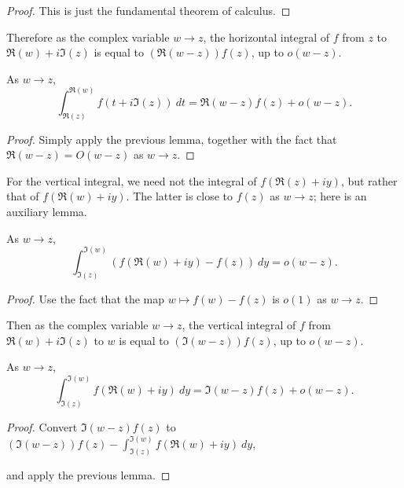  \begin{proof}

 This is just the fundamental theorem of calculus.

 \end{proof}


Therefore as the complex variable $w \to z$, the horizontal integral of $f$ from $z$ to
$\Re(w)+i\Im(z)$ is equal to $(\Re(w - z)) f(z)$, up to $o(w - z)$.
\begin{lemma}
  \label{deriv_of_wedgeInt_re}
  \leanok
  As $w \to z$,
  $$
    \int_{\Re(z)}^{\Re(w)} f(t + i\Im(z))\ dt
    =
    \Re(w-z) f(z)
    +
    o(w-z)
    .
  $$
\end{lemma}


 \begin{proof}

 Simply apply the previous lemma, together with the fact that $\Re(w - z) = O(w - z)$ as $w \to z$.

 \end{proof}


For the vertical integral, we need not the integral of $f(\Re(z)+iy)$, but rather that of $f(\Re(w)+iy)$.
The latter is close to $f(z)$ as $w \to z$; here is an auxiliary lemma.
\begin{lemma}
  \label{deriv_of_wedgeInt_im'}
  \leanok
  As $w \to z$,
  $$
    \int_{\Im(z)}^{\Im(w)} (f(\Re(w)+iy) - f (z))\ dy
    =
    o(w-z)
    .
  $$
\end{lemma}


 \begin{proof}

 Use the fact that the map $w \mapsto f(w)-f(z)$ is $o(1)$ as $w \to z$.

 \end{proof}


Then as the complex variable $w \to z$, the vertical integral of $f$ from $\Re(w)+i\Im(z)$ to
$w$ is equal to $(\Im(w - z)) f(z)$, up to $o(w - z)$.
\begin{lemma}
  \label{deriv_of_wedgeInt_im}
  \leanok
  As $w \to z$,
  $$
    \int_{\Im(z)}^{\Im(w)} f(\Re(w) + i y)\ dy
    =
    \Im(w-z) f(z)
    +
    o(w-z)
    .
  $$
\end{lemma}


 \begin{proof}

 Convert $\Im(w-z) f(z)$ to $(\Im(w-z)) f(z) - \int_{\Im(z)}^{\Im(w)} f(\Re(w) + i y)\ dy$,

 and apply the previous lemma.

 \end{proof}


